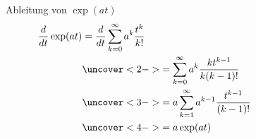 %
%
%
\bgroup
\begin{frame}[t]
  \setlength{\abovedisplayskip}{5pt}
  \setlength{\belowdisplayskip}{5pt}
  \begin{columns}[t,onlytextwidth]
    \begin{column}{0.48\textwidth}
      \begin{block}{Ableitung von $\exp(at)$}
        \begin{align*}
          \frac{d}{dt} \exp(at)
          &=
          \frac{d}{dt} \sum_{k=0}^{\infty} a^k \frac{t^k}{k!}
          \\
          &\uncover<2->{
            = \sum_{k=0}^{\infty} a^k\frac{kt^{k-1}}{k(k-1)!}
          }
          \\
          &\uncover<3->{
            = a \sum_{k=1}^{\infty}
            a^{k-1}\frac{t^{k-1}}{(k-1)!}
          }
          \\
          &\uncover<4->{
            = a \exp(at)
          }
        \end{align*}
      \end{block}
    \end{column}
    \begin{column}{0.48\textwidth}
    \end{column}
  \end{columns}  
\end{frame}

\egroup
